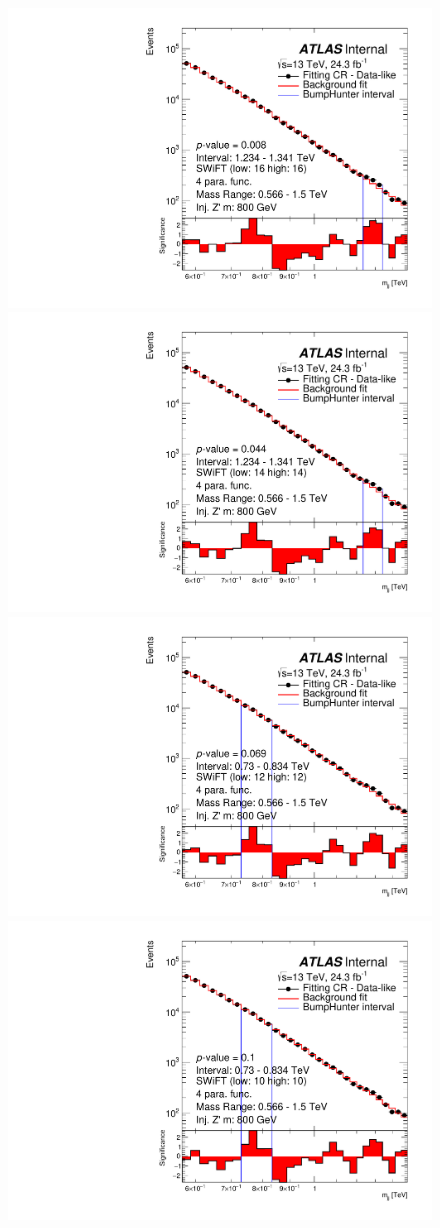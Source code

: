 \begin{figure}[!htb]
\captionsetup[subfigure]{aboveskip=0pt,justification=centering}
\centering
{} {
  \includegraphics[width=0.48\linewidth, angle=0]{figs/Dibjet/LowMass/FitStudy_min566/bhFit_corrFitCR_dataLike_4para_low16_high16_inj_Zprimebb800_xsFactor1.pdf}
}
 {
  \includegraphics[width=0.48\linewidth, angle=0]{figs/Dibjet/LowMass/FitStudy_min566/bhFit_corrFitCR_dataLike_4para_low14_high14_inj_Zprimebb800_xsFactor1.pdf}
}
 {
  \includegraphics[width=0.48\linewidth, angle=0]{figs/Dibjet/LowMass/FitStudy_min566/bhFit_corrFitCR_dataLike_4para_low12_high12_inj_Zprimebb800_xsFactor1.pdf}
}
 {
  \includegraphics[width=0.48\linewidth, angle=0]{figs/Dibjet/LowMass/FitStudy_min566/bhFit_corrFitCR_dataLike_4para_low10_high10_inj_Zprimebb800_xsFactor1.pdf}
}
\end{figure}
